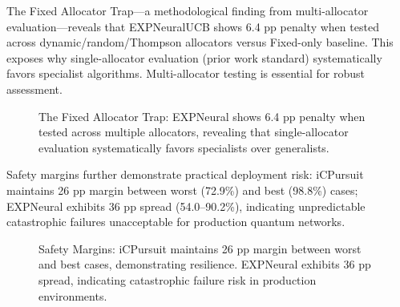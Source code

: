 \documentclass[11pt,a4paper]{article}
\begin{document}
The Fixed Allocator Trap—a methodological finding from multi-allocator evaluation—reveals that EXPNeuralUCB shows 6.4 pp penalty when tested across dynamic/random/Thompson allocators versus Fixed-only baseline. This exposes why single-allocator evaluation (prior work standard) systematically favors specialist algorithms. Multi-allocator testing is essential for robust assessment.

\begin{figure}[tb]
\centering
{}
\caption{The Fixed Allocator Trap: EXPNeural shows 6.4 pp penalty when tested across multiple allocators, revealing that single-allocator evaluation systematically favors specialists over generalists.}
\label{fig:generalization_penalty}
\end{figure}

Safety margins further demonstrate practical deployment risk: iCPursuit maintains 26 pp margin between worst (72.9\%) and best (98.8\%) cases; EXPNeural exhibits 36 pp spread (54.0--90.2\%), indicating unpredictable catastrophic failures unacceptable for production quantum networks.

\begin{figure}[tb]
\centering
{}
\caption{Safety Margins: iCPursuit maintains 26 pp margin between worst and best cases, demonstrating resilience. EXPNeural exhibits 36 pp spread, indicating catastrophic failure risk in production environments.}
\label{fig:safety_margins}
\end{figure}
\end{document}
